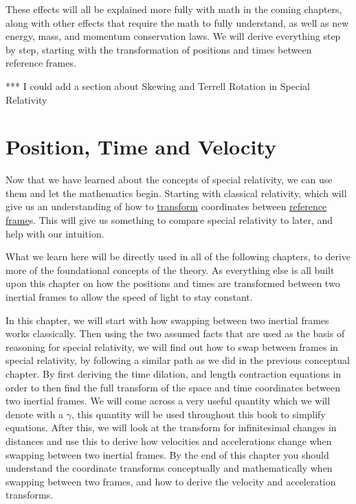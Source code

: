 These effects will all be explained more fully with math in the coming chapters, along with other effects that require the math to fully understand, as well as new energy, mass, and momentum conservation laws.
We will derive everything step by step, starting with the transformation of positions and times between reference frames.



*** I could add a section about Skewing and Terrell Rotation in Special Relativity

\printbibliography[segment=\therefsegment, heading=subbibliography] %

\chapter{Position, Time and Velocity} \label{ch: Position, Time and Velocity} %

Now that we have learned about the concepts of special relativity, we can use them and let the mathematics begin.
Starting with classical relativity, which will give us an understanding of how to \hyperlink{def-transform}{transform} coordinates between \hyperlink{def-Reference-frame}{reference frame}s.
This will give us something to compare special relativity to later, and help with our intuition.

What we learn here will be directly used in all of the following chapters, to derive more of the foundational concepts of the theory.
As everything else is all built upon this chapter on how the positions and times are transformed between two inertial frames to allow the speed of light to stay constant.

In this chapter, we will start with how swapping between two inertial frames works classically.
Then using the two assumed facts that are used as the basis of reasoning for special relativity, we will find out how to swap between frames in special relativity, by following a similar path as we did in the previous conceptual chapter.
By first deriving the time dilation, and length contraction equations in order to then find the full transform of the space and time coordinates between two inertial frames.
We will come across a very useful quantity which we will denote with a ${\gamma}$, this quantity will be used throughout this book to simplify equations.
After this, we will look at the transform for infinitesimal changes in distances and use this to derive how velocities and accelerations change when swapping between two inertial frames.
By the end of this chapter you should understand the coordinate transforms conceptually and mathematically when swapping between two frames, and how to derive the velocity and acceleration transforms.

